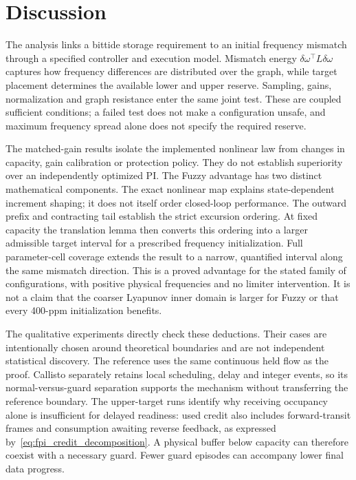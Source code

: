 \section{Discussion}
\label{sec:discussion}

The analysis links a bittide storage requirement to an initial
frequency mismatch through a specified controller and execution
model. Mismatch energy $\delta\omega^\top L\delta\omega$ captures
how frequency differences are distributed over the graph, while
target placement determines the available lower and upper reserve.
Sampling, gains, normalization and graph resistance enter the same
joint test. These are coupled sufficient conditions; a failed test
does not make a configuration unsafe, and maximum frequency spread
alone does not specify the required reserve.

The matched-gain results isolate the implemented nonlinear law from
changes in capacity, gain calibration or protection policy. They do
not establish superiority over an independently optimized PI.
The Fuzzy advantage has two distinct mathematical components.
The exact nonlinear map explains state-dependent increment shaping;
it does not itself order closed-loop performance. The outward
prefix and contracting tail establish the strict excursion ordering.
At fixed capacity the translation lemma then converts this ordering
into a larger admissible target interval for a prescribed frequency
initialization. Full parameter-cell coverage extends the result to
a narrow, quantified interval along the same mismatch direction.
This is a proved advantage for the stated family of configurations,
with positive physical frequencies and no limiter intervention.
It is not a claim that the coarser Lyapunov inner domain is larger
for Fuzzy or that every 400-ppm initialization benefits.

The qualitative experiments directly check these deductions. Their
cases are intentionally chosen around theoretical boundaries and
are not independent statistical discovery. The reference uses the
same continuous held flow as the proof. Callisto separately retains
local scheduling, delay and integer events, so its normal-versus-guard
separation supports the mechanism without transferring the reference
boundary. The upper-target runs identify why receiving occupancy
alone is insufficient for delayed readiness: used credit also includes
forward-transit frames and consumption awaiting reverse feedback,
as expressed by~\eqref{eq:fpi_credit_decomposition}. A physical
buffer below capacity can therefore coexist with a necessary guard.
Fewer guard episodes can accompany lower final data progress.

